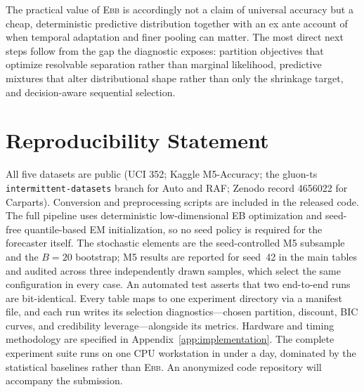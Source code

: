 \documentclass[twoside]{article}
\theoremstyle{definition}
\newcommand{\EBB}{\textsc{Ebb}}
\begin{document}
The practical value of \EBB{} is accordingly not a claim of universal
accuracy but a cheap, deterministic predictive distribution together with
an ex ante account of when temporal adaptation and finer pooling can
matter. The most direct next steps follow from the gap the diagnostic
exposes: partition objectives that optimize resolvable separation rather
than marginal likelihood, predictive mixtures that alter distributional
shape rather than only the shrinkage target, and decision-aware sequential
selection.

\section*{Reproducibility Statement}
All five datasets are public (UCI 352; Kaggle M5-Accuracy; the gluon-ts
\texttt{intermittent-datasets} branch for Auto and RAF; Zenodo record
4656022 for Carparts). Conversion and preprocessing scripts are included
in the released code. The full pipeline uses deterministic low-dimensional
EB optimization and seed-free quantile-based EM initialization, so no seed
policy is required for the forecaster itself. The stochastic elements are
the seed-controlled M5 subsample and the $B{=}20$ bootstrap; M5 results
are reported for seed~42 in the main tables and audited across three
independently drawn samples, which select the same configuration in every
case. An automated test asserts that two end-to-end runs are
bit-identical. Every table maps to one experiment directory via a manifest
file, and each run writes its selection diagnostics---chosen partition,
discount, BIC curves, and credibility leverage---alongside its metrics. Hardware and
timing methodology are specified in Appendix~\ref{app:implementation}.
The complete experiment suite runs on one CPU workstation in under a
day, dominated by the statistical baselines rather than \EBB{}. An
anonymized code repository will accompany the submission.
\end{document}
